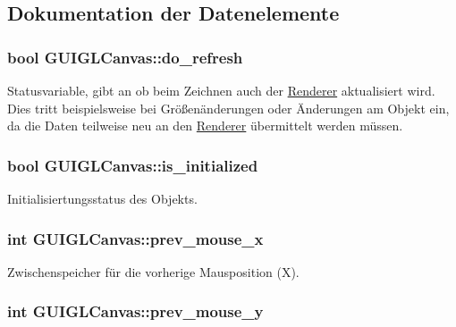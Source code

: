 \subsection{Dokumentation der Datenelemente}
\hypertarget{classGUIGLCanvas_a7139f37aa028f71e393a0c479299455d}{
\subsubsection[{do\-\_\-refresh}]{\setlength{\rightskip}{0pt plus 5cm}bool G\-U\-I\-G\-L\-Canvas\-::do\-\_\-refresh\hspace{0.3cm}{\ttfamily [private]}}}\label{classGUIGLCanvas_a7139f37aa028f71e393a0c479299455d}
Statusvariable, gibt an ob beim Zeichnen auch der \hyperlink{classRenderer}{Renderer} aktualisiert wird. Dies tritt beispielsweise bei Größenänderungen oder Änderungen am Objekt ein, da die Daten teilweise neu an den \hyperlink{classRenderer}{Renderer} übermittelt werden müssen. \hypertarget{classGUIGLCanvas_a59e01564652765dec69e7097c10b4455}{
\subsubsection[{is\-\_\-initialized}]{\setlength{\rightskip}{0pt plus 5cm}bool G\-U\-I\-G\-L\-Canvas\-::is\-\_\-initialized\hspace{0.3cm}{\ttfamily [private]}}}\label{classGUIGLCanvas_a59e01564652765dec69e7097c10b4455}
Initialisiertungsstatus des Objekts. \hypertarget{classGUIGLCanvas_afc22c47a62b8d5b165a22d059816ee22}{
\subsubsection[{prev\-\_\-mouse\-\_\-x}]{\setlength{\rightskip}{0pt plus 5cm}int G\-U\-I\-G\-L\-Canvas\-::prev\-\_\-mouse\-\_\-x\hspace{0.3cm}{\ttfamily [private]}}}\label{classGUIGLCanvas_afc22c47a62b8d5b165a22d059816ee22}
Zwischenspeicher für die vorherige Mausposition (X). \hypertarget{classGUIGLCanvas_a684c82bd591f01b5f600c9589158e0e0}{
\subsubsection[{prev\-\_\-mouse\-\_\-y}]{\setlength{\rightskip}{0pt plus 5cm}int G\-U\-I\-G\-L\-Canvas\-::prev\-\_\-mouse\-\_\-y\hspace{0.3cm}{\ttfamily [private]}}}\label{classGUIGLCanvas_a684c82bd591f01b5f600c9589158e0e0}
